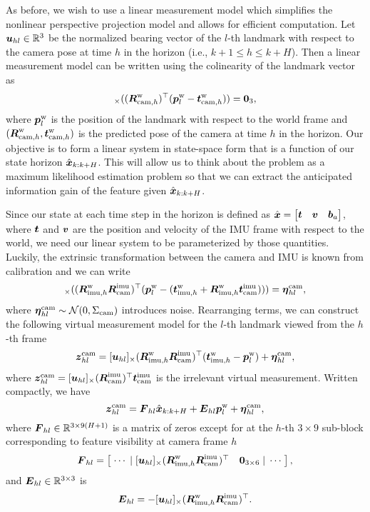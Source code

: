 As before, we wish to use a linear measurement model which simplifies the nonlinear perspective projection model and allows for efficient computation.
Let $\boldsymbol u_{hl}\in\mathbb{R}^3$ be the normalized bearing vector of the $l$-th landmark with respect to the camera pose at time $h$ in the horizon (i.e., $k+1\le h\le k+H$).
Then a linear measurement model can be written using the colinearity of the landmark vector as
\begin{equation}
[\uhl]_\times((\RWCh)^\top(\pWL-\tWCh)) = \boldsymbol 0_3,
\end{equation}
where $\boldsymbol p^\text{w}_l$ is the position of the landmark with respect to the world frame and $(\boldsymbol R^\text{w}_{\text{cam},h},\boldsymbol t^\text{w}_{\text{cam},h})$ is the predicted pose of the camera at time $h$ in the horizon.
Our objective is to form a linear system in state-space form that is a function of our state horizon $\hat{\boldsymbol x}_{k:k+H}$.
This will allow us to think about the problem as a maximum likelihood estimation problem so that we can extract the anticipated information gain of the feature given $\hat{\boldsymbol x}_{k:k+H}$.

Since our state at each time step in the horizon is defined as $\hat{\boldsymbol x}=\begin{bmatrix}\boldsymbol t&\boldsymbol v&\boldsymbol b_a\end{bmatrix}$, where $\boldsymbol t$ and $\boldsymbol v$ are the position and velocity of the IMU frame with respect to the world, we need our linear system to be parameterized by those quantities.
Luckily, the extrinsic transformation between the camera and IMU is known from calibration and we can write
\begin{equation*}
[\uhl]_\times((\RWIh\RIC)^\top(\pWL-(\tWIh+\RWIh\tIC))) = \nhl,
\end{equation*}
where $\boldsymbol \eta_{hl}^\text{cam}\sim\mathcal{N}(0,\Sigma_\text{cam})$ introduces noise.
Rearranging terms, we can construct the following virtual measurement model for the $l$-th landmark viewed from the $h$-th frame
\begin{equation*}
\boldsymbol z_{hl}^\text{cam} = [\boldsymbol u_{hl}]_\times(\boldsymbol R^\text{w}_{\text{imu},h}\boldsymbol R^\text{imu}_\text{cam})^\top(\boldsymbol t^\text{w}_{\text{imu},h}-\boldsymbol p^\text{w}_l) + \boldsymbol \eta_{hl}^\text{cam},
\end{equation*}
where $\boldsymbol z_{hl}^\text{cam}=[\boldsymbol u_{hl}]_\times(\boldsymbol R^\text{imu}_\text{cam})^\top\boldsymbol t^\text{imu}_\text{cam}$ is the irrelevant virtual measurement.
Written compactly, we have
\begin{equation}\label{eqn:vision-model}
\boldsymbol z_{hl}^\text{cam} = \boldsymbol F_{hl}\hat{\boldsymbol x}_{k:k+H} + \boldsymbol E_{hl}\boldsymbol p^\text{w}_l + \boldsymbol \eta_{hl}^\text{cam},
\end{equation}
where $\boldsymbol F_{hl}\in\mathbb{R}^{3\times 9(H+1)}$ is a matrix of zeros except for at the $h$-th $3\times 9$ sub-block corresponding to feature visibility at camera frame $h$
\begin{equation*}
\boldsymbol F_{hl} =
\begin{bmatrix}
\;\cdots\;|\;[\boldsymbol u_{hl}]_\times(\boldsymbol R^\text{w}_{\text{imu},h}\boldsymbol R^\text{imu}_\text{cam})^\top & \boldsymbol 0_{3\times 6}\;|\;\cdots\;
\end{bmatrix},
\end{equation*}
and $\boldsymbol E_{hl}\in\mathbb{R}^{3\times 3}$ is
\begin{equation*}
\boldsymbol E_{hl} = -[\boldsymbol u_{hl}]_\times(\boldsymbol R^\text{w}_{\text{imu},h}\boldsymbol R^\text{imu}_\text{cam})^\top.
\end{equation*}

